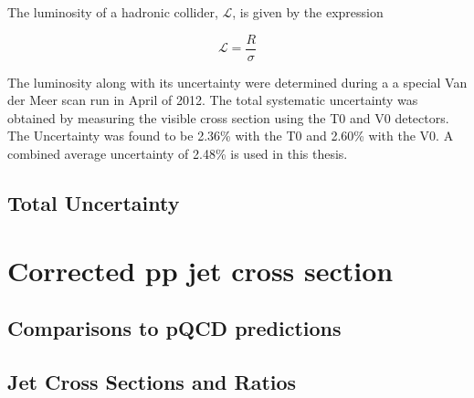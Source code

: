 The luminosity of a hadronic collider, $\mathscr{L}$, is given by the expression



\begin{equation}
\mathscr{L} = \frac{R}{\sigma}
\label{eq:xlumdef}
\end{equation}

The luminosity along with its uncertainty were determined during a a special Van der Meer scan run in April of 2012\cite{ALICE-PUBLIC-2017-002}.  The total systematic uncertainty was obtained by measuring the visible cross section using the T0 and V0 detectors.  The Uncertainty was found to be 2.36\% with the T0 and 2.60\% with the V0.  A combined average uncertainty of 2.48\% is used in this thesis.

\subsection{Total Uncertainty}

\section{Corrected pp jet cross section}


\subsection{Comparisons to pQCD predictions}

\subsection{Jet Cross Sections and Ratios}



